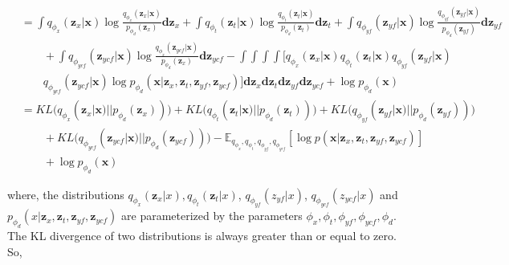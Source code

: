 \documentclass{amia}
\begin{document}
\begin{align*}
    &= \int q_{\phi_x}(\textbf{z}_x|\textbf{x}) \log \frac{q_{\phi_x}(\textbf{z}_x|\textbf{x})}{p_{\phi_d}(\textbf{z}_x)}\textbf{dz}_x 
    + \int q_{\phi_t}(\textbf{z}_t|\textbf{x}) \log \frac{q_{\phi_t}(\textbf{z}_t|\textbf{x})}{p_{\phi_d}(\textbf{z}_t)}\textbf{dz}_t
    + \int q_{\phi_{yf}}(\textbf{z}_{yf}|\textbf{x}) \log \frac{q_{\phi_{yf}}(\textbf{z}_{yf}|\textbf{x})}{p_{\phi_d}(\textbf{z}_{yf})}\textbf{dz}_{yf} \\
    &\qquad+ \int q_{\phi_{ycf}}(\textbf{z}_{ycf}|\textbf{x}) \log \frac{q_{\phi_x}(\textbf{z}_{ycf}|\textbf{x})}{p_{\phi_d}(\textbf{z}_x)}\textbf{dz}_{ycf}
    -\int\int\int\int \big[
    q_{\phi_x}(\textbf{z}_x|\textbf{x})q_{\phi_t}(\textbf{z}_t|\textbf{x})q_{\phi_{yf}}(\textbf{z}_{yf}|\textbf{x}) \\
    &\qquad q_{\phi_{ycf}}(\textbf{z}_{ycf}|\textbf{x})\log p_{\phi_d}(\textbf{x}|\textbf{z}_x, \textbf{z}_t, \textbf{z}_{yf}, \textbf{z}_{ycf})\big]
    \textbf{dz}_x \textbf{dz}_t \textbf{dz}_{yf} \textbf{dz}_{ycf}
    + \log p_{\phi_d}(\textbf{x}) \\
    &=KL\big(q_{\phi_x}(\textbf{z}_x|\textbf{x}) || p_{\phi_d}(\textbf{z}_x))\big) 
     + KL\big(q_{\phi_t}(\textbf{z}_t|\textbf{x}) || p_{\phi_d}(\textbf{z}_t))\big) +KL\big(q_{\phi_{yf}}(\textbf{z}_{yf}|\textbf{x}) || p_{\phi_d}(\textbf{z}_{yf}))\big) \\
    & \qquad + KL\big(q_{\phi_{ycf}}(\textbf{z}_{ycf}|\textbf{x}) || p_{\phi_d}(\textbf{z}_{ycf}))\big) -\mathbb{E}_{q_{\phi_x}, q_{\phi_t}, q_{\phi_{yf}}, q_{\phi_{ycf}}}[\log p(\textbf{x}|\textbf{z}_x, \textbf{z}_t, \textbf{z}_{yf}, \textbf{z}_{ycf})]\\
    & \qquad + \log p_{\phi_d}(\textbf{x})
\end{align*}

where, the distributions $q_{\phi_x}(\textbf{z}_x|x), q_{\phi_t}(\textbf{z}_t|x)$, $q_{\phi_{yf}}(z_{yf}|x)$, 
$q_{\phi_{ycf}}(z_{ycf}|x)$ and $p_{\phi_d}(x|\textbf{z}_x, \textbf{z}_t, \textbf{z}_{yf}, \textbf{z}_{ycf})$ are parameterized by the parameters
$\phi_x, \phi_t, \phi_{yf}, \phi_{ycf}, \phi_d$. The KL divergence of two distributions is always greater than or equal to zero. So,
\end{document}
